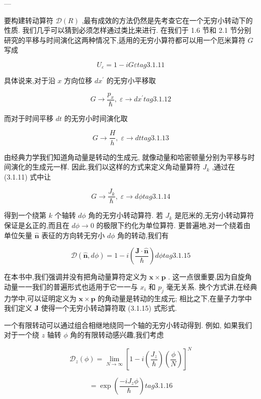 ---

要构建转动算符 $\mathcal{D}\left( R\right)$ ,最有成效的方法仍然是先考查它在一个无穷小转动下的性质. 我们几乎可以猜到必须怎样通过类比来进行. 在我们于 1.6 节和 2.1 节分别研究的平移与时间演化这两种情况下,适用的无穷小算符都可以用一个厄米算符 $G$ 写成

$$
{U}_{\varepsilon } = 1 - {iG\varepsilon } tag{3.1.11}
$$

具体说来,对于沿 $x$ 方向位移 $d{x}^{\prime }$ 的无穷小平移取

$$
G \rightarrow \frac{{p}_{x}}{\hslash },\;\varepsilon \rightarrow d{x}^{\prime } tag{3.1.12}
$$

而对于时间平移 ${dt}$ 的无穷小时间演化取

$$
G \rightarrow \frac{H}{h},\;\varepsilon \rightarrow {dt} tag{3.1.13}
$$

由经典力学我们知道角动量是转动的生成元, 就像动量和哈密顿量分别为平移与时间演化的生成元一样. 因此,我们以这样的方式来定义角动量算符 ${J}_{k}$ ,通过在 (3.1.11) 式中让

$$
G \rightarrow \frac{{J}_{k}}{\hslash },\;\varepsilon \rightarrow {d\phi } tag{3.1.14}
$$

得到一个绕第 $k$ 个轴转 ${d\phi }$ 角的无穷小转动算符. 若 ${J}_{k}$ 是厄米的,无穷小转动算符保证是幺正的,而且在 ${d\phi } \rightarrow 0$ 的极限下约化为单位算符. 更普遍地,对一个绕着由单位矢量 $\widehat{\mathbf{n}}$ 表征的方向转无穷小 ${d\phi }$ 角的转动,我们有

$$
\mathcal{D}\left( {\widehat{\mathbf{n}},{d\phi }}\right) = 1 - i\left( \frac{\mathbf{J} \cdot \widehat{\mathbf{n}}}{\hslash }\right) {d\phi } tag{3.1.15}
$$

在本书中,我们强调并没有把角动量算符定义为 $\mathbf{x} \times \mathbf{p}$ . 这一点很重要,因为自旋角动量一一我们的普遍形式也适用于它一一与 ${x}_{i}$ 和 ${p}_{j}$ 毫无关系. 换个方式讲,在经典力学中,可以证明定义为 $\mathbf{x} \times \mathbf{p}$ 的角动量是转动的生成元; 相比之下,在量子力学中我们定义 $\mathbf{J}$ 使得一个无穷小转动算符取 (3.1.15) 式形式.

一个有限转动可以通过组合相继地绕同一个轴的无穷小转动得到. 例如, 如果我们对于一个绕 $z$ 轴转 $\phi$ 角的有限转动感兴趣,我们考虑

$$
{\mathcal{D}}_{z}\left( \phi \right) = \mathop{\lim }\limits_{{N \rightarrow \infty }}{\left\lbrack 1 - i\left( \frac{{J}_{z}}{\hslash }\right) \left( \frac{\phi }{N}\right) \right\rbrack }^{N}
$$

$$
= \exp \left( \frac{-i{J}_{z}\phi }{\hslash }\right) tag{3. 1.16}
$$

